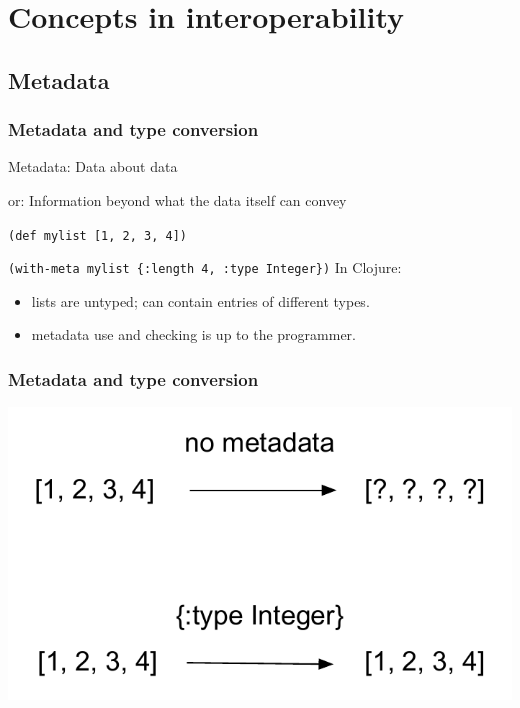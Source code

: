 \documentclass{beamer}
\newcommand{\linespace}{\vskip 0.25cm}
\begin{document}

\section[Concepts]{Concepts in interoperability}

\subsection{Metadata}

\begin{frame}
  \frametitle{Metadata and type conversion}

	Metadata: Data about data
	
	or: Information beyond what the data itself can convey
	
	{\tt (def mylist [1, 2, 3, 4])}
	
	{\tt (with-meta mylist \{:length 4, :type Integer\})}
	\linespace
	In Clojure:
	\begin{itemize}
	\item lists are untyped; can contain entries of different types.
	\item metadata use and checking is up to the programmer.
	\end{itemize}
	
	
\end{frame}


\begin{frame}
\frametitle{Metadata and type conversion}
 \begin{center}
 \includegraphics[scale=0.7]{graphics/metadataExample.pdf}
 \end{center}
\end{frame}
\end{document}
